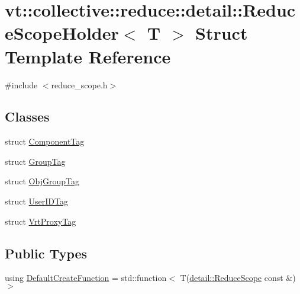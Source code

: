 \hypertarget{structvt_1_1collective_1_1reduce_1_1detail_1_1_reduce_scope_holder}{}\section{vt\+:\+:collective\+:\+:reduce\+:\+:detail\+:\+:Reduce\+Scope\+Holder$<$ T $>$ Struct Template Reference}
\label{structvt_1_1collective_1_1reduce_1_1detail_1_1_reduce_scope_holder}


{\ttfamily \#include $<$reduce\+\_\+scope.\+h$>$}

\subsection*{Classes}
\begin{DoxyCompactItemize}
\item 
struct \hyperlink{structvt_1_1collective_1_1reduce_1_1detail_1_1_reduce_scope_holder_1_1_component_tag}{Component\+Tag}
\item 
struct \hyperlink{structvt_1_1collective_1_1reduce_1_1detail_1_1_reduce_scope_holder_1_1_group_tag}{Group\+Tag}
\item 
struct \hyperlink{structvt_1_1collective_1_1reduce_1_1detail_1_1_reduce_scope_holder_1_1_obj_group_tag}{Obj\+Group\+Tag}
\item 
struct \hyperlink{structvt_1_1collective_1_1reduce_1_1detail_1_1_reduce_scope_holder_1_1_user_i_d_tag}{User\+I\+D\+Tag}
\item 
struct \hyperlink{structvt_1_1collective_1_1reduce_1_1detail_1_1_reduce_scope_holder_1_1_vrt_proxy_tag}{Vrt\+Proxy\+Tag}
\end{DoxyCompactItemize}
\subsection*{Public Types}
\begin{DoxyCompactItemize}
\item 
using \hyperlink{structvt_1_1collective_1_1reduce_1_1detail_1_1_reduce_scope_holder_ac1bca1874a023b11bdc3c26b165c3b20}{Default\+Create\+Function} = std\+::function$<$ T(\hyperlink{structvt_1_1collective_1_1reduce_1_1detail_1_1_reduce_scope}{detail\+::\+Reduce\+Scope} const  \&)$>$
\end{DoxyCompactItemize}
